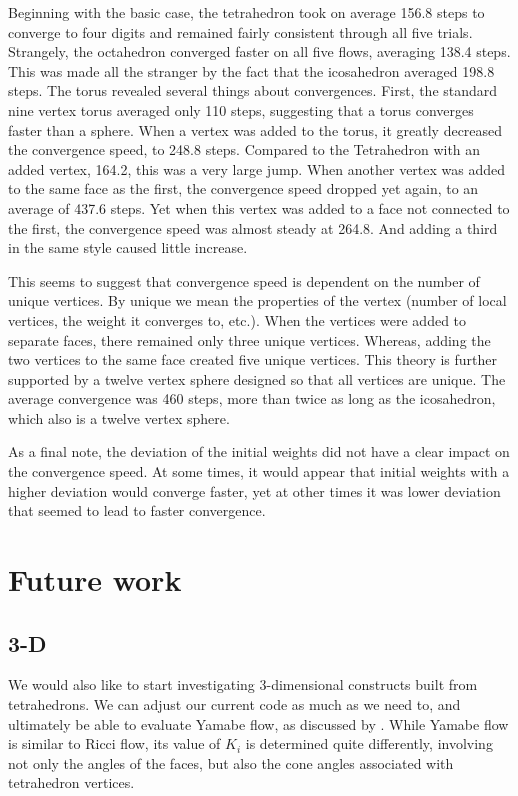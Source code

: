 \documentclass[12pt]{article}
\begin{document}
\noindent Beginning with the basic case, the tetrahedron took on average 156.8 steps to converge to four digits and remained fairly consistent through all five trials. Strangely, the octahedron converged faster on all five flows, averaging 138.4 steps. This was made all the stranger by the fact that the icosahedron averaged 198.8 steps. The torus revealed several things about convergences. First, the standard nine vertex torus averaged only 110 steps, suggesting that a torus converges faster than a sphere. When a vertex was added to the torus, it greatly decreased the convergence speed, to 248.8 steps. Compared to the Tetrahedron with an added vertex, 164.2, this was a very large jump. When another vertex was added to the same face as the first, the convergence speed dropped yet again, to an average of 437.6 steps. Yet when this vertex was added to a face not connected to the first, the convergence speed was almost steady at 264.8. And adding a third in the same style caused little increase.\newline

\noindent This seems to suggest that convergence speed is dependent on the number of unique vertices. By unique we mean the properties of the vertex (number of local vertices, the weight it converges to, etc.). When the vertices were added to separate faces, there remained only three unique vertices. Whereas, adding the two vertices to the same face created five unique vertices. This theory is further supported by a twelve vertex sphere designed so that all vertices are unique. The average convergence was 460 steps, more than twice as long as the icosahedron, which also is a twelve vertex sphere.\newline

\noindent As a final note, the deviation of the initial weights did not have a clear impact on the convergence speed. At some times, it would appear that initial weights with a higher deviation would converge faster, yet at other times it was lower deviation that seemed to lead to faster convergence.

\section{Future work}
\subsection{3-D}

We would also like to start investigating 3-dimensional constructs built from tetrahedrons. We can adjust our current code as much as we need to, and ultimately be able to evaluate Yamabe flow, as discussed by \cite{DrG}. While Yamabe flow is similar to Ricci flow, its value of $K_i$ is determined quite differently, involving not only the angles of the faces, but also the cone angles associated with tetrahedron vertices.\newline
\end{document}
